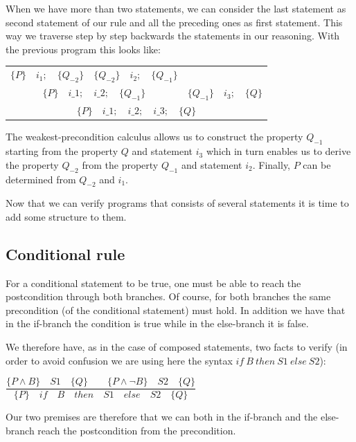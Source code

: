 \documentclass[12pt,francais,]{scrbook}
\begin{document}
When we have more than two statements, we can consider the last
statement as second statement of our rule and all the preceding ones as
first statement. This way we traverse step by step backwards the
statements in our reasoning. With the previous program this looks like:

\begin{center}
\begin{tabular}{ccc}
  $\{P\}\quad i_1 ; \quad \{Q_{-2}\}$ & $\{Q_{-2}\}\quad i_2 ; \quad \{Q_{-1}\}$ & \\
  \cline{1-2}
  \multicolumn{2}{c}{$\{P\}\quad i\_1 ; \quad i\_2 ; \quad \{Q_{-1}\}$} & $\{Q_{-1}\} \quad i_3 ; \quad \{Q\}$\\
  \hline
  \multicolumn{3}{c}{$\{P\}\quad i\_1 ; \quad i\_2 ; \quad i\_3; \quad \{ Q \}$}
\end{tabular}
\end{center}

The weakest-precondition calculus allows us to construct the property
\(Q_{-1}\) starting from the property \(Q\) and statement \(i_3\) which
in turn enables us to derive the property \(Q_{-2}\) from the property
\(Q_{-1}\) and statement \(i_2\). Finally, \(P\) can be determined from
\(Q_{-2}\) and \(i_1\).

Now that we can verify programs that consists of several statements it
is time to add some structure to them.

\subsection{Conditional rule}\label{conditional-rule}

For a conditional statement to be true, one must be able to reach the
postcondition through both branches. Of course, for both branches the
same precondition (of the conditional statement) must hold. In addition
we have that in the if-branch the condition is true while in the
else-branch it is false.

We therefore have, as in the case of composed statements, two facts to
verify (in order to avoid confusion we are using here the syntax
\(if\ B\ then\ S1\ else\ S2\)):

\begin{center}
\(\dfrac{\{P \wedge B\}\quad S1\quad \{Q\} \quad \quad \{P \wedge \neg B\}\quad S2\quad \{Q\}}{\{P\}\quad if\quad B\quad then\quad S1\quad else\quad S2 \quad \{Q\}}\)
\end{center}

Our two premises are therefore that we can both in the if-branch and the
else-branch reach the postcondition from the precondition.
\end{document}
